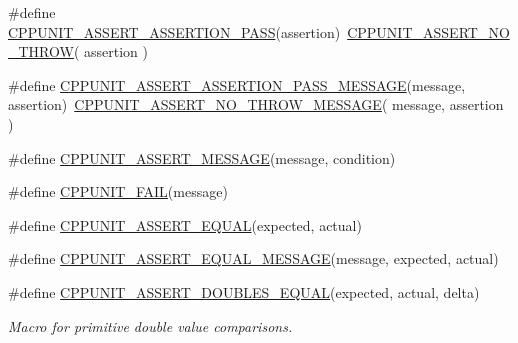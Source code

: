 \begin{DoxyCompactItemize}
\item 
\#define \hyperlink{group___assertions_ga82c2f57f5c04ce2cb211f6bd65876737}{C\+P\+P\+U\+N\+I\+T\+\_\+\+A\+S\+S\+E\+R\+T\+\_\+\+A\+S\+S\+E\+R\+T\+I\+O\+N\+\_\+\+P\+A\+S\+S}(assertion)~\hyperlink{group___assertions_ga13e42eed1f56d77d9a76242185ebdcbe}{C\+P\+P\+U\+N\+I\+T\+\_\+\+A\+S\+S\+E\+R\+T\+\_\+\+N\+O\+\_\+\+T\+H\+R\+O\+W}( assertion )
\item 
\#define \hyperlink{group___assertions_ga9dccc1cd410edc877ac42243d711fc3b}{C\+P\+P\+U\+N\+I\+T\+\_\+\+A\+S\+S\+E\+R\+T\+\_\+\+A\+S\+S\+E\+R\+T\+I\+O\+N\+\_\+\+P\+A\+S\+S\+\_\+\+M\+E\+S\+S\+A\+G\+E}(message, assertion)~\hyperlink{group___assertions_gaae2428381cbd7355b354473ebe2dc5ac}{C\+P\+P\+U\+N\+I\+T\+\_\+\+A\+S\+S\+E\+R\+T\+\_\+\+N\+O\+\_\+\+T\+H\+R\+O\+W\+\_\+\+M\+E\+S\+S\+A\+G\+E}( message, assertion )
\item 
\#define \hyperlink{group___assertions_gadb3d7be52fb36db9b627ded165cfa335}{C\+P\+P\+U\+N\+I\+T\+\_\+\+A\+S\+S\+E\+R\+T\+\_\+\+M\+E\+S\+S\+A\+G\+E}(message, condition)
\item 
\#define \hyperlink{group___assertions_ga26aaaa22505b7a7b4978f0401a86f12a}{C\+P\+P\+U\+N\+I\+T\+\_\+\+F\+A\+I\+L}(message)
\item 
\#define \hyperlink{group___assertions_ga71162f05be07ef6817d156e77c68b1a3}{C\+P\+P\+U\+N\+I\+T\+\_\+\+A\+S\+S\+E\+R\+T\+\_\+\+E\+Q\+U\+A\+L}(expected, actual)
\item 
\#define \hyperlink{group___assertions_gafad9998a5abcf0bc12e88f24dbfb67be}{C\+P\+P\+U\+N\+I\+T\+\_\+\+A\+S\+S\+E\+R\+T\+\_\+\+E\+Q\+U\+A\+L\+\_\+\+M\+E\+S\+S\+A\+G\+E}(message, expected, actual)
\item 
\#define \hyperlink{group___assertions_ga9d88b1e379e4a9ba2a5e9e79763389ea}{C\+P\+P\+U\+N\+I\+T\+\_\+\+A\+S\+S\+E\+R\+T\+\_\+\+D\+O\+U\+B\+L\+E\+S\+\_\+\+E\+Q\+U\+A\+L}(expected, actual, delta)
\begin{DoxyCompactList}\small\item\em Macro for primitive double value comparisons.


\end{DoxyCompactList}
\end{DoxyCompactItemize}
